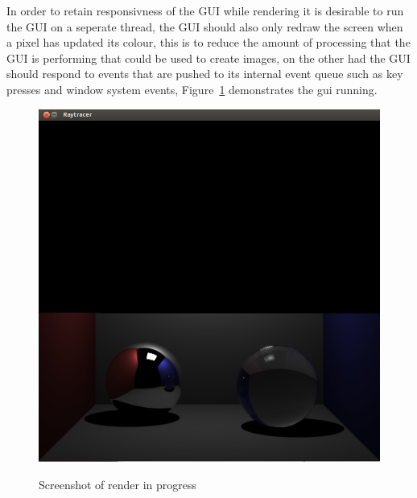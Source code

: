 In order to retain responsivness of the GUI while rendering it is desirable to run the GUI on a seperate thread, the GUI
should also only redraw the screen when a pixel has updated its colour, this is to reduce the amount of processing that
the GUI is performing that could be used to create images, on the other had the GUI should respond to events that are pushed
to its internal event queue such as key presses and window system events, Figure~\ref{fig:gui_screenshot} demonstrates the
gui running.

\begin{figure}[h]
\centering
\includegraphics[scale=0.24]{./images/gui_screenshot.png}
\label{fig:gui_screenshot}
\caption{Screenshot of render in progress}
\end{figure}
